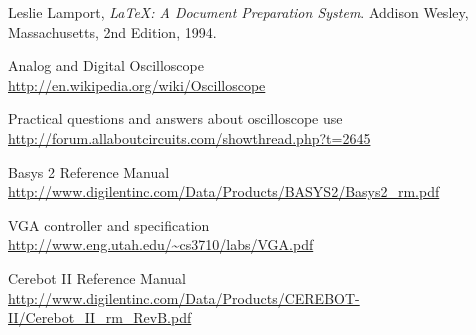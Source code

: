\begin{thebibliography}{99}

  Leslie Lamport,
  \emph{\LaTeX: A Document Preparation System}.
  Addison Wesley, Massachusetts,
  2nd Edition,
  1994.

 Analog and Digital Oscilloscope\\
\url{ http://en.wikipedia.org/wiki/Oscilloscope}

 Practical questions and answers about oscilloscope use\\
\url{ http://forum.allaboutcircuits.com/showthread.php?t=2645 }

 Basys 2 Reference Manual\\
\url{ http://www.digilentinc.com/Data/Products/BASYS2/Basys2\_rm.pdf }

 VGA controller and specification\\
\url{ http://www.eng.utah.edu/~cs3710/labs/VGA.pdf }

 Cerebot II Reference Manual\\
\url{ http://www.digilentinc.com/Data/Products/CEREBOT-II/Cerebot\_II\_rm\_RevB.pdf }


\end{thebibliography}